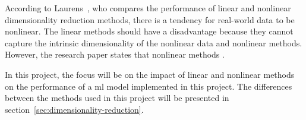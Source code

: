 According to Laurens~\cite{dimensionality-reduction-comparative-review}, who compares the performance of linear and nonlinear dimensionality reduction methods, there is a tendency for real-world data to be nonlinear. The linear methods should have a disadvantage because they cannot capture the intrinsic dimensionality of the nonlinear data and nonlinear methods. However, the research paper states that nonlinear methods .

In this project, the focus will be on the impact of linear and nonlinear methods on the performance of a \gls{ml} model implemented in this project. The differences between the methods used in this project will be presented in section~\ref{sec:dimensionality-reduction}.





